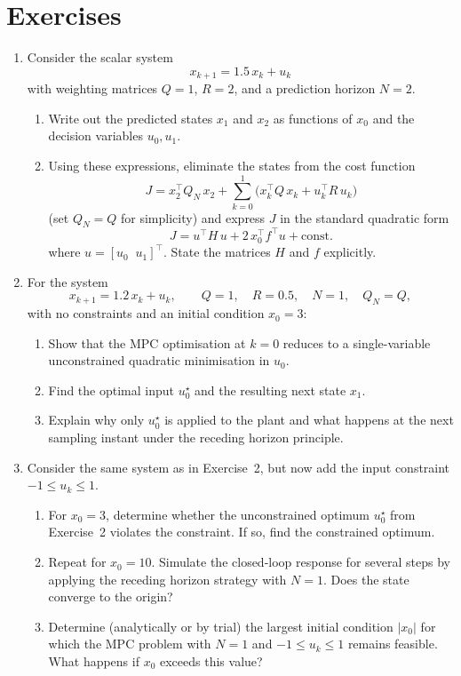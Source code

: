 \section*{Exercises}
\begin{enumerate}

\item Consider the scalar system
\[
x_{k+1} = 1.5\, x_k + u_k
\]
with weighting matrices $Q = 1$, $R = 2$, and a prediction horizon $N = 2$.
\begin{enumerate}
	\item Write out the predicted states $x_1$ and $x_2$ as functions of $x_0$ and the decision variables $u_0, u_1$.
	\item Using these expressions, eliminate the states from the cost function
	\[
	J = x_2^\top Q_N\, x_2 + \sum_{k=0}^{1}\bigl(x_k^\top Q\, x_k + u_k^\top R\, u_k\bigr)
	\]
	(set $Q_N = Q$ for simplicity) and express $J$ in the standard quadratic form
	\[
	J = u^\top H\, u + 2\, x_0^\top f^\top u + \text{const.}
	\]
	where $u = [u_0 \;\; u_1]^\top$. State the matrices $H$ and $f$ explicitly.
\end{enumerate}

\item For the system
\[
x_{k+1} = 1.2\, x_k + u_k, \qquad Q = 1, \quad R = 0.5, \quad N = 1, \quad Q_N = Q,
\]
with no constraints and an initial condition $x_0 = 3$:
\begin{enumerate}
	\item Show that the MPC optimisation at $k = 0$ reduces to a single-variable unconstrained quadratic minimisation in $u_0$.
	\item Find the optimal input $u_0^\star$ and the resulting next state $x_1$.
	\item Explain why only $u_0^\star$ is applied to the plant and what happens at the next sampling instant under the receding horizon principle.
\end{enumerate}

\item Consider the same system as in Exercise~2, but now add the input constraint $-1 \le u_k \le 1$.
\begin{enumerate}
	\item For $x_0 = 3$, determine whether the unconstrained optimum $u_0^\star$ from Exercise~2 violates the constraint. If so, find the constrained optimum.
	\item Repeat for $x_0 = 10$. Simulate the closed-loop response for several steps by applying the receding horizon strategy with $N = 1$. Does the state converge to the origin?
	\item Determine (analytically or by trial) the largest initial condition $|x_0|$ for which the MPC problem with $N = 1$ and $-1 \le u_k \le 1$ remains feasible. What happens if $x_0$ exceeds this value?
\end{enumerate}


\end{enumerate}
